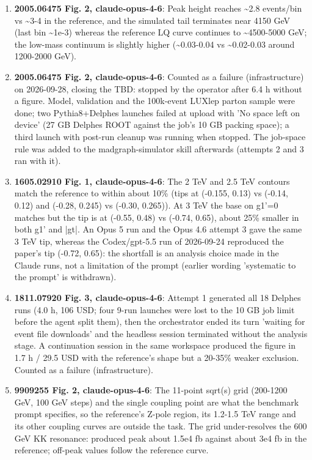 \begin{enumerate}
\item \textbf{2005.06475 Fig. 2, claude-opus-4-6}: Peak height reaches \textasciitilde{}2.8 events/bin vs \textasciitilde{}3-4 in the reference, and the simulated tail terminates near 4150 GeV (last bin \textasciitilde{}1e-3) whereas the reference LQ curve continues to \textasciitilde{}4500-5000 GeV; the low-mass continuum is slightly higher (\textasciitilde{}0.03-0.04 vs \textasciitilde{}0.02-0.03 around 1200-2000 GeV).
\item \textbf{2005.06475 Fig. 2, claude-opus-4-6}: Counted as a failure (infrastructure) on 2026-09-28, closing the TBD: stopped by the operator after 6.4 h without a figure. Model, validation and the 100k-event LUXlep parton sample were done; two Pythia8+Delphes launches failed at upload with 'No space left on device' (27 GB Delphes ROOT against the job's 10 GB packing space); a third launch with post-run cleanup was running when stopped. The job-space rule was added to the madgraph-simulator skill afterwards (attempts 2 and 3 ran with it).
\item \textbf{1605.02910 Fig. 1, claude-opus-4-6}: The 2 TeV and 2.5 TeV contours match the reference to within about 10\% (tips at (-0.155, 0.13) vs (-0.14, 0.12) and (-0.28, 0.245) vs (-0.30, 0.265)). At 3 TeV the base on g1'=0 matches but the tip is at (-0.55, 0.48) vs (-0.74, 0.65), about 25\% smaller in both g1' and |gt|. An Opus 5 run and the Opus 4.6 attempt 3 gave the same 3 TeV tip, whereas the Codex/gpt-5.5 run of 2026-09-24 reproduced the paper's tip (-0.72, 0.65): the shortfall is an analysis choice made in the Claude runs, not a limitation of the prompt (earlier wording 'systematic to the prompt' is withdrawn).
\item \textbf{1811.07920 Fig. 3, claude-opus-4-6}: Attempt 1 generated all 18 Delphes runs (4.0 h, 106 USD; four 9-run launches were lost to the 10 GB job limit before the agent split them), then the orchestrator ended its turn 'waiting for event file downloads' and the headless session terminated without the analysis stage. A continuation session in the same workspace produced the figure in 1.7 h / 29.5 USD with the reference's shape but a 20-35\% weaker exclusion. Counted as a failure (infrastructure).
\item \textbf{9909255 Fig. 2, claude-opus-4-6}: The 11-point sqrt(s) grid (200-1200 GeV, 100 GeV steps) and the single coupling point are what the benchmark prompt specifies, so the reference's Z-pole region, its 1.2-1.5 TeV range and its other coupling curves are outside the task. The grid under-resolves the 600 GeV KK resonance: produced peak about 1.5e4 fb against about 3e4 fb in the reference; off-peak values follow the reference curve.

\end{enumerate}
